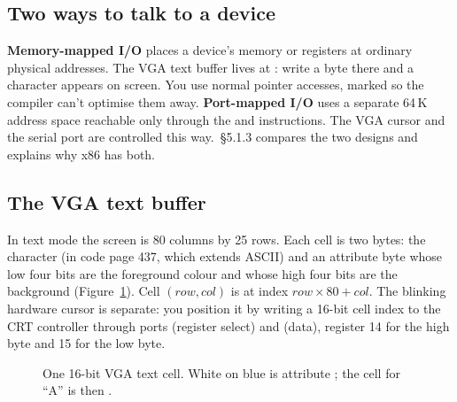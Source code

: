 \documentclass[11pt,a4paper]{article}
\begin{document}
\subsection{Two ways to talk to a device}

\textbf{Memory-mapped I/O} places a device's memory or registers at ordinary physical addresses. The VGA text buffer
lives at : write a byte there and a character appears on screen. You use normal pointer accesses,
marked  so the compiler can't optimise them away. \textbf{Port-mapped I/O} uses a separate 64\,K
address space reachable only through the  and  instructions. The VGA cursor and the serial port
are controlled this way. \MOS\,\S5.1.3 compares the two designs and explains why x86 has both.

\subsection{The VGA text buffer}

In text mode the screen is 80 columns by 25 rows. Each cell is two bytes: the character (in code page 437, which
extends ASCII) and an attribute byte whose low four bits are the foreground colour and whose high four bits are the
background (Figure~\ref{fig:vgacell}). Cell $(row, col)$ is at index $row \times 80 + col$. The blinking hardware
cursor is separate: you position it by writing a 16-bit cell index to the CRT controller through ports
 (register select) and  (data), register 14 for the high byte and 15 for the low byte.

\begin{figure}[htbp]
\centering
{}
\caption{One 16-bit VGA text cell. White on blue is attribute ; the cell for ``A'' is then .}
\label{fig:vgacell}
\end{figure}
\end{document}
